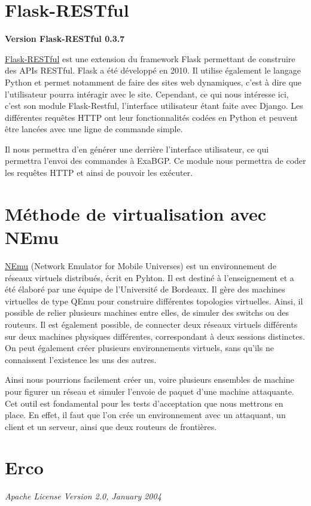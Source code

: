 \section{Flask-RESTful}
\textbf{Version Flask-RESTful 0.3.7}

\href{https://flask-restful.readthedocs.io/en/latest/}{Flask-RESTful} est une extension du framework Flask permettant de construire des APIs RESTful. Flask a été développé en 2010. Il utilise également le langage Python et permet notamment de faire des sites web dynamiques, c'est à dire que l'utilisateur pourra intéragir avec le site. Cependant, ce qui nous intéresse ici, c'est son module Flask-Restful, l'interface utilisateur étant faite avec Django. Les différentes requêtes HTTP ont leur fonctionnalités codées en Python et peuvent être lancées avec une ligne de commande simple.

Il nous permettra d'en générer une derrière l'interface utilisateur, ce qui permettra l'envoi des commandes à ExaBGP. Ce module nous permettra de coder les requêtes HTTP et ainsi de pouvoir les exécuter.

\section{Méthode de virtualisation avec NEmu}
\href{https://gitlab.com/v-a/nemu}{NEmu} (Network Emulator for Mobile Universes) est un environnement de réseaux virtuels distribués, écrit en Pyhton. Il est destiné à l'enseignement et a été élaboré par une équipe de l'Université de Bordeaux. Il gère des machines virtuelles de type QEmu pour construire différentes topologies virtuelles. Ainsi, il possible de relier plusieurs machines entre elles, de simuler des switchs ou des routeurs. Il est également possible, de connecter deux réseaux virtuels différents sur deux machines physiques différentes, correspondant à deux sessions distinctes. On peut également créer plusieurs environnements virtuels, sans qu'ils ne connaissent l'existence les uns des autres.

Ainsi nous pourrions facilement créer un, voire plusieurs ensembles de machine pour figurer un réseau et simuler l'envoie de paquet d'une machine attaquante. Cet outil est fondamental pour les tests d'acceptation que nous mettrons en place. En effet, il faut que l'on crée un environnement avec un attaquant, un client et un serveur, ainsi que deux routeurs de frontières.

\section{Erco}
\textit{Apache License Version 2.0, January 2004}

